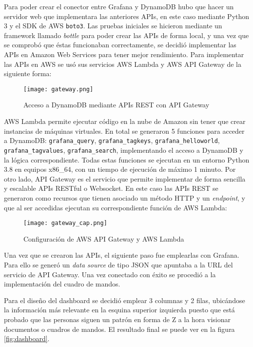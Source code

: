 Para poder crear el conector entre Grafana y DynamoDB hubo que hacer un servidor web que implementara las anteriores APIs, en este caso mediante Python 3 y el SDK de AWS \texttt{boto3}. Las pruebas iniciales se hicieron mediante un framework llamado \textit{bottle} para poder crear las APIs de forma local, y una vez que se comprobó que éstas funcionaban correctamente, se decidió implementar las APIs en Amazon Web Services para tener mejor rendimiento. Para implementar las APIs en AWS se usó sus servicios AWS Lambda y AWS API Gateway de la siguiente forma:

\begin{figure}[H]
    \centering
    \texttt{[image: gateway.png]}
    \caption{Acceso a DynamoDB mediante APIs REST con API Gateway}
    \label{fig:gateway_schema}
\end{figure}

AWS Lambda permite ejecutar código en la nube de Amazon sin tener que crear instancias de máquinas virtuales. En total se generaron 5 funciones para acceder a DynamoDB: \texttt{grafana\_query}, \texttt{grafana\_tagkeys}, \texttt{grafana\_helloworld}, \texttt{grafana\_tagvalues}, \texttt{grafana\_search}, implementando el acceso a DynamoDB y la lógica correspondiente. Todas estas funciones se ejecutan en un entorno Python 3.8 en equipos x86\_64, con un tiempo de ejecución de máximo 1 minuto. Por otro lado, API Gateway es el servicio que permite implementar de forma sencilla y escalable APIs RESTful o Websocket. En este caso las APIs REST se generaron como recursos que tienen asociado un método HTTP y un \textit{endpoint}, y que al ser accedidas ejecutan su correspondiente función de AWS Lambda:

\begin{figure}[H]
    \hspace*{-1cm}
    \centering
    \texttt{[image: gateway\_cap.png]}
    \caption{Configuración de AWS API Gateway y AWS Lambda}
    \label{fig:gateway_cap}
\end{figure}

Una vez que se crearon las APIs, el siguiente paso fue emplearlas con Grafana. Para ello se generó un \textit{data source} de tipo JSON que apuntaba a la URL del servicio de API Gateway. Una vez conectado con éxito se procedió a la implementación del cuadro de mandos.

Para el diseño del dashboard se decidió emplear 3 columnas y 2 filas, ubicándose la información más relevante en la esquina superior izquierda puesto que está probado que las personas siguen un patrón en forma de Z a la hora visionar documentos o cuadros de mandos. El resultado final se puede ver en la figura \ref{fig:dashboard}.

